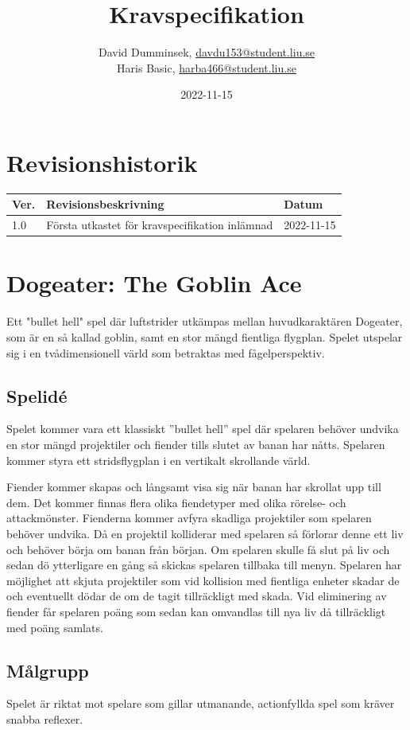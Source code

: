 \documentclass{TDP005mall}
\author{David Dumminsek, \url{davdu153@student.liu.se}\\
  Haris Basic, \url{harba466@student.liu.se}\\
  }
\title{Kravspecifikation}
\date{2022-11-15}
\begin{document}
\projectpage
\section{Revisionshistorik}
\begin{table}[!h]
\begin{tabularx}{\linewidth}{|l|X|l|}
\hline
Ver. & Revisionsbeskrivning & Datum \\\hline
1.0 & Första utkastet för kravspecifikation inlämnad & 2022-11-15 \\\hline
\end{tabularx}
\end{table}

\section{Dogeater: The Goblin Ace}

Ett "bullet hell" spel där luftstrider utkämpas mellan huvudkaraktären Dogeater, som är en så kallad goblin, samt en stor mängd fientliga flygplan.
Spelet utspelar sig i en tvådimensionell värld som betraktas med fågelperspektiv.

\subsection{Spelidé}
Spelet kommer vara ett klassiskt ''bullet hell'' spel där spelaren behöver undvika en stor mängd projektiler och fiender tills slutet av banan har nåtts. 
Spelaren kommer styra ett stridsflygplan i en vertikalt skrollande värld.

Fiender kommer skapas och långsamt visa sig när banan har skrollat upp till dem. Det kommer finnas flera olika fiendetyper med olika rörelse- och attackmönster. 
Fienderna kommer avfyra skadliga projektiler som spelaren behöver undvika. Då en projektil kolliderar med spelaren så förlorar denne ett liv och behöver börja om banan från början.
Om spelaren skulle få slut på liv och sedan dö ytterligare en gång så skickas spelaren tillbaka till menyn.
Spelaren har möjlighet att skjuta projektiler som vid kollision med fientliga enheter skadar de och eventuellt dödar de om de tagit tillräckligt med skada.
Vid eliminering av fiender får spelaren poäng som sedan kan omvandlas till nya liv då tillräckligt med poäng samlats.

\subsection{Målgrupp}
Spelet är riktat mot spelare som gillar utmanande, actionfyllda spel som kräver snabba reflexer.
\end{document}
